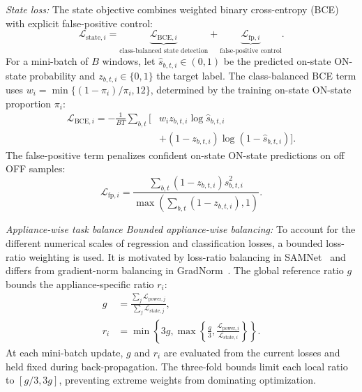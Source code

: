 \documentclass[journal]{IEEEtran}
\providecommand{\DIFadd}[1]{{\protect\color{blue} \sf #1}} %
\providecommand{\DIFdel}[1]{{\protect\color{red} \scriptsize #1}} %
\providecommand{\DIFaddbegin}{} %
\providecommand{\DIFaddend}{} %
\providecommand{\DIFdelbegin}{} %
\providecommand{\DIFdelend}{} %
\providecommand{\DIFscaledelfig}{0.5}
\newlength{\DIFdelgraphicswidth} %
\newlength{\DIFdelgraphicsheight} %
\providecommand{\DIFaddincludegraphics}[2][]{{\color{blue}\fbox{\DIFOincludegraphics[#1]{#2}}}} %
\providecommand{\DIFdelincludegraphics}[2][]{%
\sbox{\DIFdelgraphicsbox}{\DIFOincludegraphics[#1]{#2}}%
\settoboxwidth{\DIFdelgraphicswidth}{\DIFdelgraphicsbox} %
\settoboxtotalheight{\DIFdelgraphicsheight}{\DIFdelgraphicsbox} %
\scalebox{\DIFscaledelfig}{%
\parbox[b]{\DIFdelgraphicswidth}{\usebox{\DIFdelgraphicsbox}\\[-\baselineskip] \rule{\DIFdelgraphicswidth}{0em}}\llap{\resizebox{\DIFdelgraphicswidth}{\DIFdelgraphicsheight}{%
\setlength{\unitlength}{\DIFdelgraphicswidth}%
\begin{picture}(1,1)%
\thicklines\linethickness{2pt} %
{\color[rgb]{1,0,0}\put(0,0){\framebox(1,1){}}}%
{\color[rgb]{1,0,0}\put(0,0){\line( 1,1){1}}}%
{\color[rgb]{1,0,0}\put(0,1){\line(1,-1){1}}}%
\end{picture}%
}\hspace*{3pt}}} %
} %
\DeclareRobustCommand{\DIFaddbegin}{\DIFOaddbegin \let\includegraphics\DIFaddincludegraphics} %
\DeclareRobustCommand{\DIFaddend}{\DIFOaddend \let\includegraphics\DIFOincludegraphics} %
\DeclareRobustCommand{\DIFdelbegin}{\DIFOdelbegin \let\includegraphics\DIFdelincludegraphics} %
\DeclareRobustCommand{\DIFdelend}{\DIFOaddend \let\includegraphics\DIFOincludegraphics} %
\begin{document}
\DIFdelend \textit{State loss:}
The state objective combines weighted binary cross-entropy (BCE) with explicit false-positive control:
\begin{equation}
\mathcal{L}_{\mathrm{state},i}=
\underbrace{\mathcal{L}_{\mathrm{BCE},i}}_{\text{class-balanced state detection}}
+\underbrace{\mathcal{L}_{\mathrm{fp},i}}_{\text{false-positive control}}.
\label{eq:state-loss}
\end{equation}
For a mini-batch of $B$ windows, let $\hat s_{b,t,i}\in(0,1)$ be the predicted \DIFdelbegin \DIFdel{on-state }\DIFdelend \DIFaddbegin \DIFadd{ON-state }\DIFaddend probability and $z_{b,t,i}\in\{0,1\}$ the target label. The class-balanced BCE term uses $w_i=\min\{(1-\pi_i)/\pi_i,12\}$, determined by the training \DIFdelbegin \DIFdel{on-state }\DIFdelend \DIFaddbegin \DIFadd{ON-state }\DIFaddend proportion $\pi_i$:
\begin{equation}
\begin{aligned}
\mathcal{L}_{\mathrm{BCE},i}=-\frac{1}{BT}\sum_{b,t}\bigl[&
w_i z_{b,t,i}\log\hat s_{b,t,i}\\
&+(1-z_{b,t,i})\log(1-\hat s_{b,t,i})\bigr].
\end{aligned}
\label{eq:weighted-bce}
\end{equation}
The false-positive term penalizes confident \DIFdelbegin \DIFdel{on-state }\DIFdelend \DIFaddbegin \DIFadd{ON-state }\DIFaddend predictions on \DIFdelbegin \DIFdel{off }\DIFdelend \DIFaddbegin \DIFadd{OFF }\DIFaddend samples:
\begin{equation}
\mathcal{L}_{\mathrm{fp},i}=
\frac{\sum_{b,t}(1-z_{b,t,i})\hat s_{b,t,i}^{2}}{\max\left(\sum_{b,t}(1-z_{b,t,i}),1\right)}.
\label{eq:false-positive-loss}
\end{equation}

\textit{\DIFdelbegin \DIFdel{Appliance-wise task balance}\DIFdelend \DIFaddbegin \DIFadd{Bounded appliance-wise balancing}\DIFaddend :}
To account for the different numerical scales of regression and classification losses, a bounded loss-ratio weighting is used. It is motivated by loss-ratio balancing in SAMNet~\cite{liu2022samnet} and differs from gradient-norm balancing in GradNorm~\cite{chen2018gradnorm}. The global reference ratio $g$ bounds the appliance-specific ratio $r_i$:
\begin{equation}
\begin{aligned}
g&=
\frac{\sum_j\mathcal{L}_{\mathrm{power},j}}{\sum_j\mathcal{L}_{\mathrm{state},j}},\\[-1pt]
r_i&=\min\!\left\{3g,\max\!\left\{
\frac{g}{3},
\frac{\mathcal{L}_{\mathrm{power},i}}{\mathcal{L}_{\mathrm{state},i}}
\right\}\right\}.
\end{aligned}
\label{eq:balanced-ratio}
\end{equation}
At each mini-batch update, $g$ and $r_i$ are evaluated from the current losses and held fixed during back-propagation. The three-fold bounds limit each local ratio to $[g/3,3g]$, preventing extreme weights from dominating optimization.
\end{document}
